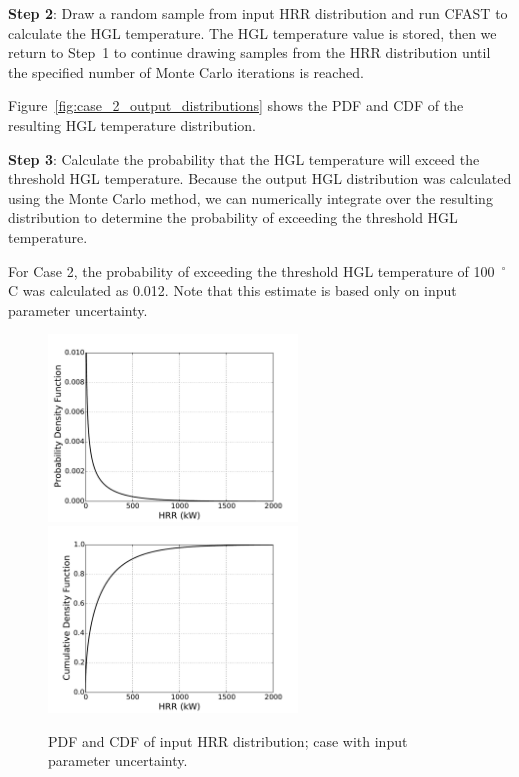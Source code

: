 \documentclass[12pt]{article}
\begin{document}
\textbf{Step 2}: Draw a random sample from input HRR distribution and run CFAST to calculate the HGL temperature. The HGL temperature value is stored, then we return to Step~1 to continue drawing samples from the HRR distribution until the specified number of Monte Carlo iterations is reached.

Figure~\ref{fig:case_2_output_distributions} shows the PDF and CDF of the resulting HGL temperature distribution.

\textbf{Step 3}: Calculate the probability that the HGL temperature will exceed the threshold HGL temperature. Because the output HGL distribution was calculated using the Monte Carlo method, we can numerically integrate over the resulting distribution to determine the probability of exceeding the threshold HGL temperature.

For Case 2, the probability of exceeding the threshold HGL temperature of 100~$^\circ$C was calculated as 0.012. Note that this estimate is based only on input parameter uncertainty.


\clearpage


\begin{figure}[p]
\includegraphics[width=2.6in]{Figures/input_PDF}
\includegraphics[width=2.6in]{Figures/input_CDF}
\caption{PDF and CDF of input HRR distribution; case with input parameter uncertainty.}
\label{fig:case_2_input_distributions}
\end{figure}
\end{document}
